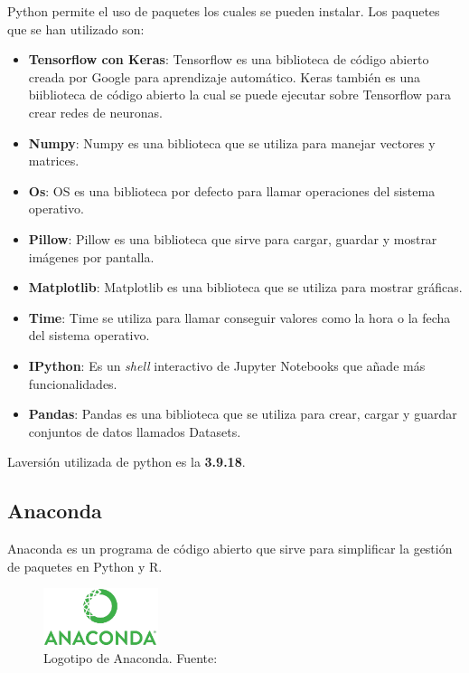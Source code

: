 Python permite el uso de paquetes los cuales se pueden instalar. Los paquetes que se han utilizado son:

\begin{itemize}
	\item \textbf{Tensorflow con Keras}: Tensorflow es una biblioteca de código abierto creada por Google para aprendizaje automático\cite{wiki_tensorflow,tensorflow_website}. Keras también es una biiblioteca de código abierto la cual se puede ejecutar sobre Tensorflow para crear redes de neuronas\cite{keras_website}.
	\item \textbf{Numpy}: Numpy es una biblioteca que se utiliza para manejar vectores y matrices\cite{numpy}.
	\item \textbf{Os}: OS es una biblioteca por defecto para llamar operaciones del sistema operativo.
	\item \textbf{Pillow}: Pillow es una biblioteca que sirve para cargar, guardar y mostrar imágenes por pantalla.
	\item \textbf{Matplotlib}: Matplotlib es una biblioteca que se utiliza para mostrar gráficas.
	\item \textbf{Time}: Time se utiliza para llamar conseguir valores como la hora o la fecha del sistema operativo.
	\item \textbf{IPython}: Es un \textit{shell} interactivo de Jupyter Notebooks que añade más funcionalidades.
	\item \textbf{Pandas}: Pandas es una biblioteca que se utiliza para crear, cargar y guardar conjuntos de datos llamados Datasets.
\end{itemize}

Laversión utilizada de python es la \textbf{3.9.18}.

\subsection{Anaconda}

Anaconda es un programa de código abierto que sirve para simplificar la gestión de paquetes en Python y R\cite{anacondaWiki}.

\begin{figure}[H]
	\centering
	\includegraphics[width=0.3\textwidth]{figures/anaconda_logo.jpg}
	\caption{\label{fig:anaconda}Logotipo de Anaconda. Fuente: \cite{anacondaRTD}}
\end{figure}

